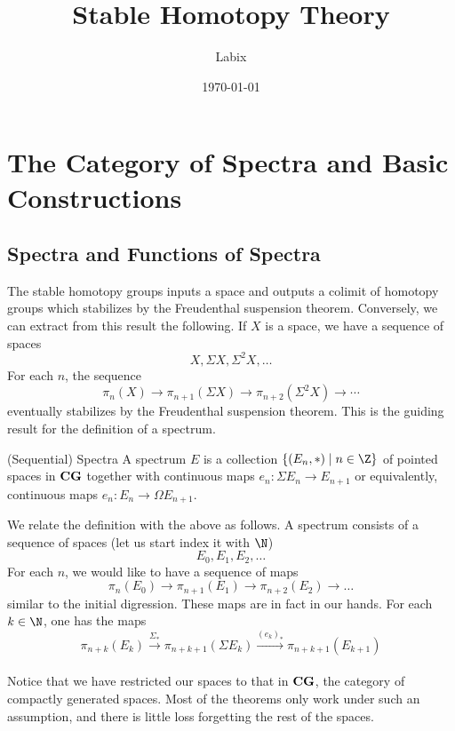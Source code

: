 \documentclass[a4paper]{article}
\title{Stable Homotopy Theory}
\author{Labix}
\date{\today}
\begin{document}
\maketitle
\begin{abstract}
\begin{itemize}
\end{itemize}
\end{abstract}
\pagebreak
\tableofcontents

\pagebreak
\section{The Category of Spectra and Basic Constructions}
\subsection{Spectra and Functions of Spectra}
The stable homotopy groups inputs a space and outputs a colimit of homotopy groups which stabilizes by the Freudenthal suspension theorem. Conversely, we can extract from this result the following. If $X$ is a space, we have a sequence of spaces $$X,\Sigma X,\Sigma^2X,\dots$$ For each $n$, the sequence $$\pi_n(X)\to\pi_{n+1}(\Sigma X)\to\pi_{n+2}(\Sigma^2X)\to\cdots$$ eventually stabilizes by the Freudenthal suspension theorem. This is the guiding result for the definition of a spectrum. 

\begin{defn}{(Sequential) Spectra}{} A spectrum $E$ is a collection $\{(E_n,\ast)\;|\;n\in\Z\}$ of pointed spaces in $\bold{CG}$ together with continuous maps $e_n:\Sigma E_n\to E_{n+1}$ or equivalently, continuous maps $e_n:E_n\to\Omega E_{n+1}$. 
\end{defn}

We relate the definition with the above as follows. A spectrum consists of a sequence of spaces (let us start index it with $\N$) $$E_0,E_1,E_2,\dots$$ For each $n$, we would like to have a sequence of maps $$\pi_n(E_0)\to\pi_{n+1}(E_1)\to\pi_{n+2}(E_2)\to\dots$$ similar to the initial digression. These maps are in fact in our hands. For each $k\in\N$, one has the maps $$\pi_{n+k}(E_k)\overset{\Sigma_\ast}{\to}\pi_{n+k+1}(\Sigma E_k)\overset{(e_k)_\ast}{\to}\pi_{n+k+1}(E_{k+1})$$~\\

Notice that we have restricted our spaces to that in $\bold{CG}$, the category of compactly generated spaces. Most of the theorems only work under such an assumption, and there is little loss forgetting the rest of the spaces. 
\end{document}

